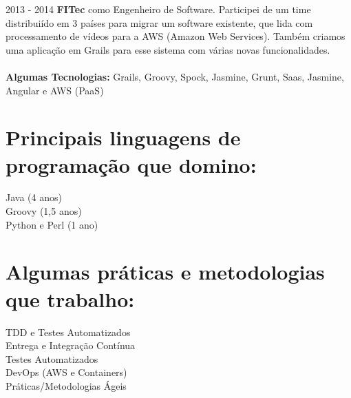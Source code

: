 \documentclass[]{friggeri-cv}
\begin{document}
\newpage
\begin{entrylist}  
  \entry
    {2013 - 2014}
    {{\normalfont \textbf{FITec} como Engenheiro de Software.  Participei de um time distribuiído em 3 países para migrar um software existente, que lida com processamento de vídeos para a AWS (Amazon Web Services). Também criamos uma aplicação em Grails para esse sistema com várias novas funcionalidades.\\
        \\\textbf{Algumas Tecnologias:} Grails, Groovy, Spock, Jasmine, Grunt, Saas, Jasmine, Angular e AWS (PaaS)
    }}{}{}
\end{entrylist}

\section{Principais linguagens de programação que domino:}
Java (4 anos)\\
Groovy (1,5 anos)\\
Python e Perl (1 ano)\\

\section{Algumas práticas e metodologias que trabalho:}
\begin{multicols}{2}
    TDD e Testes Automatizados\\
    Entrega e Integração Contínua\\
    Testes Automatizados\\
    DevOps (AWS e Containers)\\
    Práticas/Metodologias Ágeis\\
\end{multicols}
\end{document}
